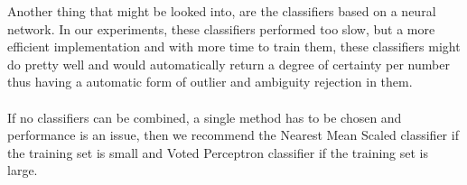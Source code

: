\documentclass[%
        compressed,
        final,
        notitlepage,
        narroweqnarray,
        inline,
        twoside,
        ]{ieee}
\begin{document}
Another thing that might be looked into, are the classifiers based on a neural
network. In our experiments, these classifiers performed too slow, but a more
efficient implementation and with more time to train them, these classifiers
might do pretty well and would automatically return a degree of certainty per number thus having a automatic form of outlier and ambiguity rejection in them.\\\\
If no classifiers can be combined, a single method has to be chosen and
performance is an issue, then we recommend the Nearest Mean Scaled classifier if
the training set is small and Voted Perceptron classifier if the training set is
large.

%
%

\printbibliography
\end{document}
